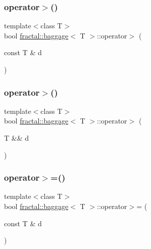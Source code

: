 \mbox{\label{classfractal_1_1baggage_a4493652a35653bf385084afbc26a7957}} 
\subsubsection{\texorpdfstring{operator$>$()}{operator>()}\hspace{0.1cm}{\footnotesize\ttfamily [1/2]}}
{\footnotesize\ttfamily template$<$class T$>$ \\
bool \hyperlink{classfractal_1_1baggage}{fractal\+::baggage}$<$ T $>$\+::operator$>$ (\begin{DoxyParamCaption}\item[{const T \&}]{d }\end{DoxyParamCaption})\hspace{0.3cm}{\ttfamily [inline]}}

\mbox{\label{classfractal_1_1baggage_ae712ad4484a737818897ef6057253bcb}} 
\subsubsection{\texorpdfstring{operator$>$()}{operator>()}\hspace{0.1cm}{\footnotesize\ttfamily [2/2]}}
{\footnotesize\ttfamily template$<$class T$>$ \\
bool \hyperlink{classfractal_1_1baggage}{fractal\+::baggage}$<$ T $>$\+::operator$>$ (\begin{DoxyParamCaption}\item[{T \&\&}]{d }\end{DoxyParamCaption})\hspace{0.3cm}{\ttfamily [inline]}}

\mbox{\label{classfractal_1_1baggage_a4552b3ca7b1aefaa892483d4c1694a3c}} 
\subsubsection{\texorpdfstring{operator$>$=()}{operator>=()}\hspace{0.1cm}{\footnotesize\ttfamily [1/2]}}
{\footnotesize\ttfamily template$<$class T$>$ \\
bool \hyperlink{classfractal_1_1baggage}{fractal\+::baggage}$<$ T $>$\+::operator$>$= (\begin{DoxyParamCaption}\item[{const T \&}]{d }\end{DoxyParamCaption})\hspace{0.3cm}{\ttfamily [inline]}}

